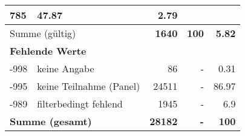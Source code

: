 \begin{longtable}{lXrrr}
       \num{785} &
       \num[round-mode=places,round-precision=2]{47,87} &
         \num[round-mode=places,round-precision=2]{2,79} \\
     \midrule
     \multicolumn{2}{l}{Summe (gültig)} &
       \textbf{\num{1640}} &
     \textbf{100} &
       \textbf{\num[round-mode=places,round-precision=2]{5,82}} \\
     \multicolumn{5}{l}{\textbf{Fehlende Werte}}\\
       -998 &
       keine Angabe &
         \num{86} &
        - &
         \num[round-mode=places,round-precision=2]{0,31} \\
       -995 &
       keine Teilnahme (Panel) &
         \num{24511} &
        - &
         \num[round-mode=places,round-precision=2]{86,97} \\
       -989 &
       filterbedingt fehlend &
         \num{1945} &
        - &
         \num[round-mode=places,round-precision=2]{6,9} \\
     \midrule
     \multicolumn{2}{l}{\textbf{Summe (gesamt)}} &
          \textbf{\num{28182}} &
        \textbf{-} &
        \textbf{100} \\
     \bottomrule
     \end{longtable}
     
